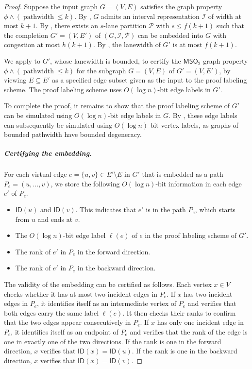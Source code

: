 \documentclass[11pt]{article}
\theoremstyle{definition}
\theoremstyle{remark}
\newcommand{\MSO}{\mathsf{MSO}_2}
\newcommand{\ID}{\mathsf{ID}}
\begin{document}
\begin{proof}
Suppose the input graph $G=(V,E)$ satisfies the graph property $\phi \wedge (\operatorname{pathwidth}\leq k)$.
By , $G$ admits an interval representation $\mathcal{I}$ of width at most $k+1$.
By , there exists an $s$-lane partition $\mathcal{P}$ with $s \leq f(k+1)$ such that the completion $G'=(V,  E')$ of $(G,\mathcal{I},\mathcal{P})$ can be embedded into $G$ with congestion at most $h(k+1)$. By , the lanewidth of $G'$ is at most $f(k+1)$.

We apply  to $G'$, whose lanewidth is bounded, to certify the $\MSO$ graph property $\phi \wedge (\operatorname{pathwidth}\leq k)$ for the subgraph $G=(V,E)$ of $G'=(V,E')$, by viewing $E \subseteq E'$ as a specified edge subset given as the input to the proof labeling scheme. The proof labeling scheme uses $O(\log n)$-bit edge labels in $G'$. 

To complete the proof, it remains to show that the proof labeling scheme of $G'$ can be simulated using $O(\log n)$-bit edge labels in $G$. By , these edge labels can subsequently be simulated using $O(\log n)$-bit vertex labels, as graphs of bounded pathwidth have bounded degeneracy.

\subparagraph{Certifying the embedding.} For each virtual edge $e=\{u,v\} \in E' \setminus E$ in $G'$ that is embedded as a path $P_e = (u, \ldots, v)$, we store the following $O(\log n)$-bit information in each edge $e'$ of $P_e$.
\begin{itemize}
    \item $\ID(u)$ and $\ID(v)$. This indicates that $e'$ is in the path $P_e$, which starts from $u$ and ends at $v$.
    \item The $O(\log n)$-bit edge label $\ell(e)$ of $e$ in the proof labeling scheme of $G'$.
    \item The rank of $e'$ in $P_e$ in the forward direction.
    \item The rank of $e'$ in $P_e$ in the backward direction.
\end{itemize}
The validity of the embedding can be certified as follows. Each vertex $x \in V$ checks whether it has at most two incident edges in $P_e$. If $x$ has two incident edges in $P_e$, it identifies itself as an intermediate vertex of $P_e$ and verifies that both edges carry the same label $\ell(e)$. It then checks their ranks to confirm that the two edges appear consecutively in $P_e$. If $x$ has only one incident edge in $P_e$, it identifies itself as an endpoint of $P_e$ and verifies that the rank of the edge is one in exactly one of the two directions. If the rank is one in the forward direction, $x$ verifies that $\ID(x) = \ID(u)$. If the rank is one in the backward direction, $x$ verifies that $\ID(x) = \ID(v)$.


\end{proof}
\end{document}
